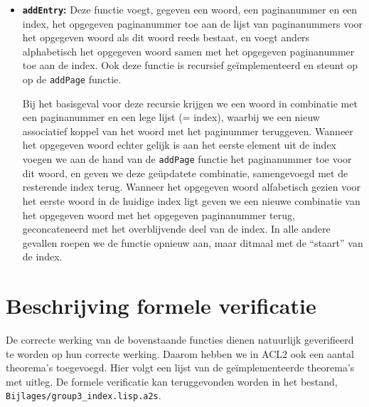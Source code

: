 \begin{itemize}
\item \textbf{\texttt{addEntry}:} Deze functie voegt, gegeven een woord, een paginanummer en een index, het opgegeven paginanummer toe aan de lijst van paginanummers voor het opgegeven woord als dit woord reeds bestaat, en voegt anders alphabetisch het opgegeven woord samen met het opgegeven paginanummer toe aan de index. Ook deze functie is recursief geïmplementeerd en steunt op op de \texttt{addPage} functie.

Bij het basisgeval voor deze recursie krijgen we een woord in combinatie met een paginanummer en een lege lijst (= index), waarbij we een nieuw associatief koppel van het woord met het paginummer teruggeven. Wanneer het opgegeven woord echter gelijk is aan het eerste element uit de index voegen we aan de hand van de \texttt{addPage} functie het paginanummer toe voor dit woord, en geven we deze geüpdatete combinatie, samengevoegd met de resterende index terug. Wanneer het opgegeven woord alfabetisch gezien voor het eerste woord in de huidige index ligt geven we een nieuwe combinatie van het opgegeven woord met het opgegeven paginanummer terug, geconcateneerd met het overblijvende deel van de index. In alle andere gevallen roepen we de functie opnieuw aan, maar ditmaal met de ``staart'' van de index.
\end{itemize}


\section{Beschrijving formele verificatie}
De correcte werking van de bovenstaande functies dienen natuurlijk geverifieerd te worden op hun correcte werking. Daarom hebben we in ACL2 ook een aantal theorema's toegevoegd. Hier volgt een lijst van de geïmplementeerde theorema's met uitleg. De formele verificatie kan teruggevonden worden in het bestand, \texttt{Bijlages/group3\_index.lisp.a2s}.

